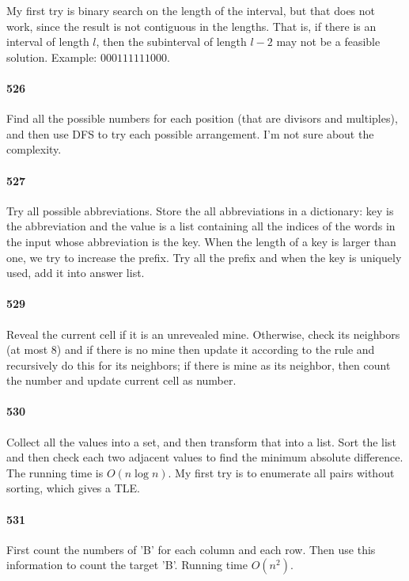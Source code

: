 \documentclass[11pt]{article}
\begin{document}
My first try is binary search on the length of the interval, but that does not work, since the result is not contiguous in the lengths. That is, if there is an interval of length $l$, then the subinterval of length $l-2$ may not be a feasible solution. Example: $000111111000$.


\paragraph{526}
Find all the possible numbers for each position (that are divisors and multiples), and then use DFS to try each possible arrangement.
I'm not sure about the complexity. 

\paragraph{527}
Try all possible abbreviations. Store the all abbreviations in a dictionary: key is the abbreviation and the value is a list
containing all the indices of the words in the input whose abbreviation is the key. When the length of a key is larger than 
one, we try to increase the prefix. Try all the prefix and when the key is uniquely used, add it into answer list.


\paragraph{529}
Reveal the current cell if it is an unrevealed mine.
Otherwise, check its neighbors (at most 8) and if there is no mine then update it according to the rule and recursively do this for its neighbors; if there is mine as its neighbor, then count the number and update current cell as number.

\paragraph{530}
Collect all the values into a set, and then transform that into a list.
Sort the list and then check each two adjacent values to find the minimum absolute difference. 
The running time is $O(n \log n)$.
My first try is to enumerate all pairs without sorting, which gives a TLE.

\paragraph{531}
First count the numbers of 'B' for each column and each row. Then use this information to count the target 'B'.
Running time $O(n^2)$.
\end{document}
